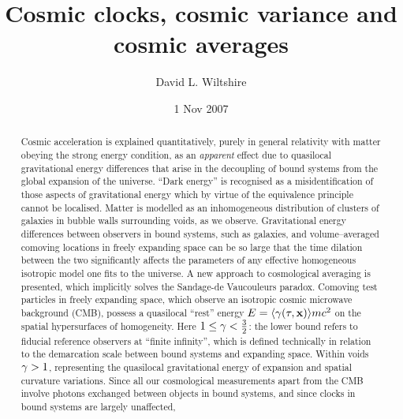\documentclass[12pt]{article}
\begin{document}
\title{Cosmic clocks, cosmic variance and cosmic averages}
\author{David L. Wiltshire}
\date{1 Nov 2007}
\maketitle

\begin{abstract}
Cosmic acceleration is explained quantitatively, purely in
general relativity with matter obeying the strong energy condition, as an
{\em apparent} effect due to quasilocal gravitational energy differences
that arise in the decoupling of bound systems from the global expansion of
the universe. ``Dark energy'' is recognised as a misidentification of those
aspects of gravitational energy which by virtue of the equivalence principle
cannot be localised. Matter is modelled as an
inhomogeneous distribution of clusters of galaxies in bubble walls
surrounding voids, as we observe. Gravitational energy differences between
observers in bound systems, such as galaxies, and volume--averaged comoving
locations in freely expanding space can be so large that the time dilation
between the two significantly affects the parameters of any effective
homogeneous isotropic model one fits to the universe. A new approach to
cosmological averaging is presented, which implicitly solves the Sandage-de
Vaucouleurs paradox. Comoving
test particles in freely expanding space, which observe an isotropic cosmic
microwave background (CMB), possess a quasilocal ``rest'' energy
$E=\langle{\gamma(\tau,{\mathbf x})}\rangle m c^2$ on the spatial hypersurfaces of
homogeneity. Here $1\le\gamma<\frac32$: the lower bound refers to fiducial
reference observers at ``finite infinity'', which is defined technically in
relation to the demarcation scale between bound systems and expanding space.
Within voids $\gamma>1$, representing the quasilocal gravitational energy of
expansion and spatial curvature variations. Since all our cosmological
measurements apart from the CMB involve photons exchanged between objects
in bound systems, and since clocks in bound systems are largely unaffected,

\end{abstract}
\end{document}
